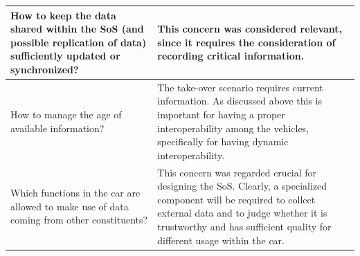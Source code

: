 \begin{longtable}{p{}p{}}
\hline
How to keep the data shared within the SoS (and possible replication of data) sufficiently updated or synchronized? & 
This concern was considered relevant, since it requires the consideration of recording critical information. 
\\
\hline
How to manage the age of available information? & 
The take-over scenario requires current information.
As discussed above this is important for having a proper interoperability among the vehicles, specifically for having dynamic interoperability.\\
\hline
Which functions in the car are allowed to make use of data coming from other constituents?
&
This concern was regarded crucial for designing the SoS. 
Clearly, a specialized component will be required to collect external data and to judge whether it is trustworthy and has sufficient quality for different usage within the car.\\
\hline
\end{longtable}
